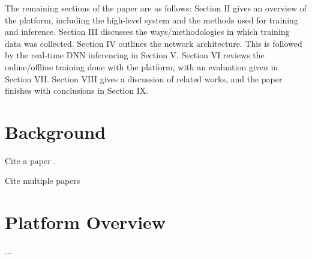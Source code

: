 \documentclass[10pt, conference]{IEEEtran}
\begin{document}



The remaining sections of the paper are as follows: Section II gives
an overview of the platform, including the high-level system and the
methods used for training and inference. Section III discusses the
ways/methodologies in which training data was collected. Section IV
outlines the network architecture. This is followed by the real-time
DNN inferencing in Section V. Section VI reviews the online/offline
training done with the platform, with an evaluation given in Section
VII. Section VIII gives a discussion of related works, and the paper
finishes with conclusions in Section IX. 

\section{Background}
Cite a paper \cite{barroso2009datacenter}.

Cite multiple papers \cite{banga99resourcecontainers,barroso2009datacenter}

\section{Platform Overview}
...
\end{document}
